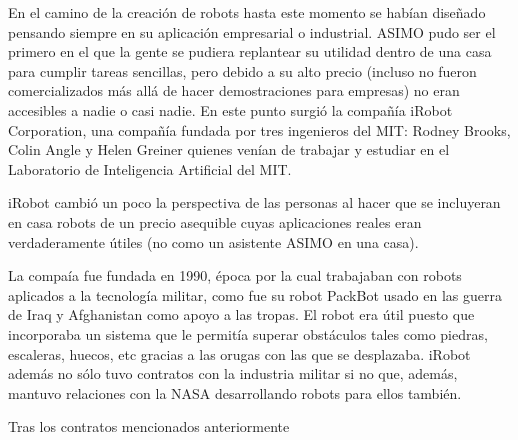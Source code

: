 En el camino de la creación de robots hasta este momento se habían diseñado pensando siempre en su aplicación empresarial o industrial. ASIMO pudo ser el primero en el que la gente se pudiera replantear su utilidad dentro de una casa para cumplir tareas sencillas, pero debido a su alto precio (incluso no fueron comercializados más allá de hacer demostraciones para empresas) no eran accesibles a nadie o casi nadie. En este punto surgió la compañía iRobot Corporation, una compañía fundada por tres ingenieros del MIT: Rodney Brooks, Colin Angle y Helen Greiner quienes venían de trabajar y estudiar en el Laboratorio de Inteligencia Artificial del MIT.

iRobot cambió un poco la perspectiva de las personas al hacer que se incluyeran en casa robots de un precio asequible cuyas aplicaciones reales eran verdaderamente útiles (no como un asistente ASIMO en una casa).

La compaía fue fundada en 1990, época por la cual trabajaban con robots aplicados a la tecnología militar, como fue su robot PackBot usado en las guerra de Iraq y Afghanistan como apoyo a las tropas. El robot era útil puesto que incorporaba un sistema que le permitía superar obstáculos tales como piedras, escaleras, huecos, etc gracias a las orugas con las que se desplazaba. iRobot además no sólo tuvo contratos con la industria militar si no que, además, mantuvo relaciones con la NASA desarrollando robots para ellos también.

Tras los contratos mencionados anteriormente 
